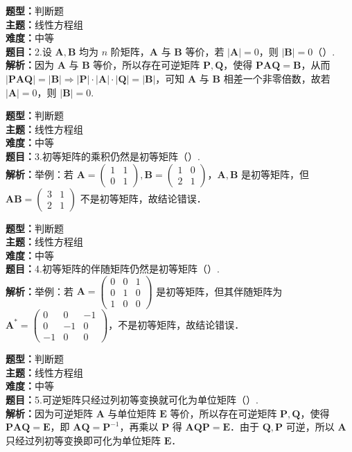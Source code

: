 \documentclass{ctexart}
\newenvironment{question}[5]{%
	\noindent\textbf{题型：}#1\\
	\textbf{主题：}#2\\
	\textbf{难度：}#3\\
	\textbf{题目：}#4\\
	\textbf{解析：}#5\\
	\vspace{1em}
}{}
\begin{document}
	\begin{question}
		{判断题}
		{线性方程组}
		{中等}
		{2.设 \(\mathbf{A}, \mathbf{B}\) 均为 \(n\) 阶矩阵，\(\mathbf{A}\) 与 \(\mathbf{B}\) 等价，若 \(|\mathbf{A}|=0\)，则 \(|\mathbf{B}|=0\)（）.}
		{因为 \(\mathbf{A}\) 与 \(\mathbf{B}\) 等价，所以存在可逆矩阵 \(\mathbf{P}, \mathbf{Q}\)，使得 \(\mathbf{P A Q} = \mathbf{B}\)，从而 \(|\mathbf{P A Q}| = |\mathbf{B}| \Rightarrow |\mathbf{P}| \cdot |\mathbf{A}| \cdot |\mathbf{Q}| = |\mathbf{B}|\)，可知 \(\mathbf{A}\) 与 \(\mathbf{B}\) 相差一个非零倍数，故若 \(|\mathbf{A}|=0\)，则 \(|\mathbf{B}|=0\).}
	\end{question}
	
	\begin{question}
		{判断题}
		{线性方程组}
		{中等}
		{3.初等矩阵的乘积仍然是初等矩阵（）. }
		{举例：若 \(\mathbf{A}=\begin{pmatrix}1 & 1 \\ 0 & 1\end{pmatrix}, \mathbf{B}=\begin{pmatrix}1 & 0 \\ 2 & 1\end{pmatrix}\)，\(\mathbf{A}, \mathbf{B}\) 是初等矩阵，但 \(\mathbf{AB} = \begin{pmatrix}3 & 1 \\ 2 & 1\end{pmatrix}\) 不是初等矩阵，故结论错误．}
	\end{question}
	
	\begin{question}
		{判断题}
		{线性方程组}
		{中等}
		{4.初等矩阵的伴随矩阵仍然是初等矩阵（）. }
		{举例：若 \(\mathbf{A}=\begin{pmatrix}0 & 0 & 1 \\ 0 & 1 & 0 \\ 1 & 0 & 0\end{pmatrix}\) 是初等矩阵，但其伴随矩阵为 \(\mathbf{A}^*=\begin{pmatrix}0 & 0 & -1 \\ 0 & -1 & 0 \\ -1 & 0 & 0\end{pmatrix}\)，不是初等矩阵，故结论错误．}
	\end{question}
	
	\begin{question}
		{判断题}
		{线性方程组}
		{中等}
		{5.可逆矩阵只经过列初等变换就可化为单位矩阵（）. }
		{因为可逆矩阵 \(\mathbf{A}\) 与单位矩阵 \(\mathbf{E}\) 等价，所以存在可逆矩阵 \(\mathbf{P}, \mathbf{Q}\)，使得 \(\mathbf{PAQ} = \mathbf{E}\)，即 \(\mathbf{AQ} = \mathbf{P}^{-1}\)，再乘以 \(\mathbf{P}\) 得 \(\mathbf{AQP} = \mathbf{E}\)．由于 \(\mathbf{Q}, \mathbf{P}\) 可逆，所以 \(\mathbf{A}\) 只经过列初等变换即可化为单位矩阵 \(\mathbf{E}\)．}
	\end{question}
	
\end{document}
